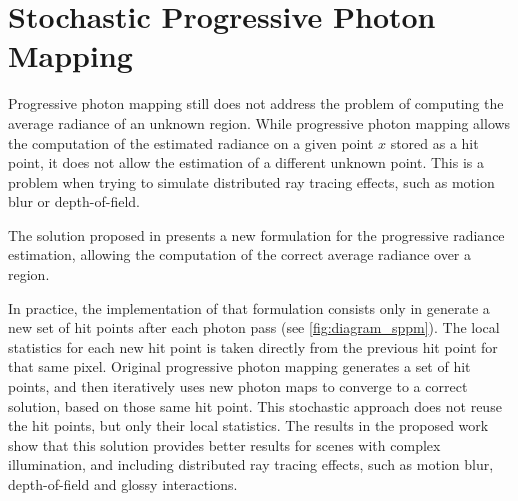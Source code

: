 \documentclass[main.tex]{subfiles}
\begin{document}
\section{Stochastic Progressive Photon Mapping} \label{section:sppm}

Progressive photon mapping still does not address the problem of computing the average radiance of an unknown region.  While progressive photon mapping allows the computation of the estimated radiance on a given point $x$ stored as a hit point, it does not allow the estimation of a different unknown point. This is a problem when trying to simulate distributed ray tracing effects, such as motion blur or depth-of-field.

The solution proposed in \cite{jensenstochastic} presents a new formulation for the progressive radiance estimation, allowing the computation of the correct average radiance over a region.

In practice, the implementation of that formulation consists only in generate a new set of hit points after each photon pass (see \cref{fig:diagram_sppm}). The local statistics for each new hit point is taken directly from the previous hit point for that same pixel. Original progressive photon mapping generates a set of hit points, and then iteratively uses new photon maps to converge to a correct solution, based on those same hit point.
This stochastic approach does not reuse the hit points, but only their local statistics. The results in the proposed work show that this solution provides better results for scenes with complex illumination, and including distributed ray tracing effects, such as motion blur, depth-of-field and glossy interactions.

\end{document}
